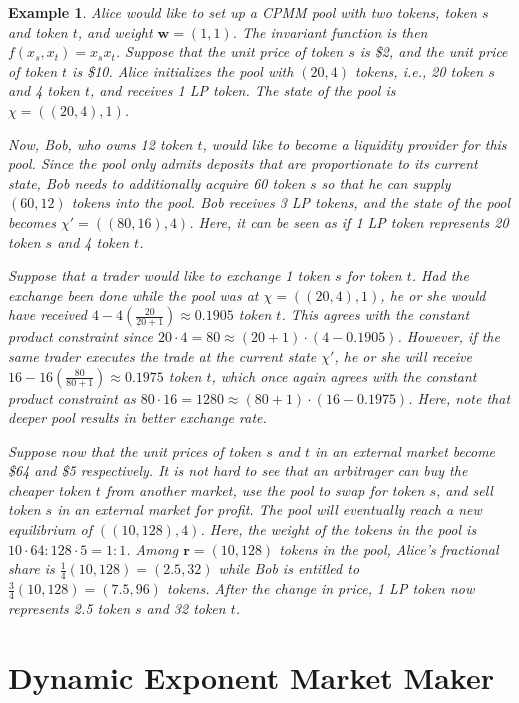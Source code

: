 \documentclass[12pt,a4paper]{article}
\newtheorem{example}[corollary]{Example}
\begin{document}
\begin{example}\label{ex:cpmm}
Alice would like to set up a CPMM pool with two tokens, token $s$ and token $t$, and weight $\mathbf{w}=(1,1)$. The invariant function is then $f(x_s,x_t)=x_sx_t$. Suppose that the unit price of token $s$ is \$2, and the unit price of token $t$ is \$10. Alice initializes the pool with $(20,4)$ tokens, i.e., 20 token $s$ and 4 token $t$, and receives 1 LP token. The state of the pool is $\chi=((20,4),1)$.

Now, Bob, who owns 12 token $t$, would like to become a liquidity provider for this pool. Since the pool only admits deposits that are proportionate to its current state, Bob needs to additionally acquire 60 token $s$ so that he can supply $(60,12)$ tokens into the pool. Bob receives 3 LP tokens, and the state of the pool becomes $\chi'=((80,16),4)$. Here, it can be seen as if 1 LP token represents 20 token $s$ and 4 token $t$.

Suppose that a trader would like to exchange 1 token $s$ for token $t$. Had the exchange been done while the pool was at $\chi=((20,4),1)$, he or she would have received $4-4\left(\frac{20}{20+1}\right)\approx0.1905$ token $t$. This agrees with the constant product constraint since $20\cdot4=80\approx(20+1)\cdot(4-0.1905)$. However, if the same trader executes the trade at the current state $\chi'$, he or she will receive $16-16\left(\frac{80}{80+1}\right)\approx0.1975$ token $t$, which once again agrees with the constant product constraint as $80\cdot16=1280\approx(80+1)\cdot(16-0.1975)$. Here, note that deeper pool results in better exchange rate.

Suppose now that the unit prices of token $s$ and $t$ in an external market become \$64 and \$5 respectively. It is not hard to see that an arbitrager can buy the cheaper token $t$ from another market, use the pool to swap for token $s$, and sell token $s$ in an external market for profit. The pool will eventually reach a new equilibrium of $((10,128),4)$. Here, the weight of the tokens in the pool is $10\cdot64:128\cdot5=1:1$. Among $\mathbf{r}=(10,128)$ tokens in the pool, Alice's fractional share is $\frac{1}{4}(10,128)=(2.5,32)$ while Bob is entitled to $\frac{3}{4}(10,128)=(7.5,96)$ tokens. After the change in price, 1 LP token now represents 2.5 token $s$ and 32 token $t$.
\end{example}

\section{Dynamic Exponent Market Maker}
\end{document}
